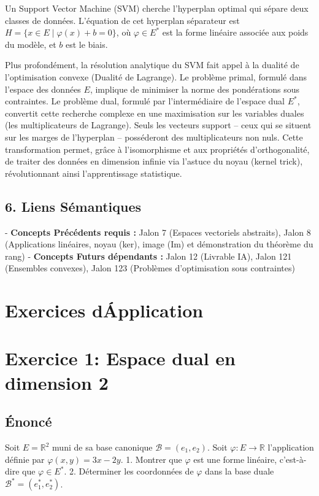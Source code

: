 \documentclass{report}
\begin{document}
Un Support Vector Machine (SVM) cherche l'hyperplan optimal qui sépare deux classes de données. L'équation de cet hyperplan séparateur est $H = \{ x \in E \mid \varphi(x) + b = 0 \}$, où $\varphi \in E^*$ est la forme linéaire associée aux poids du modèle, et $b$ est le biais.

Plus profondément, la résolution analytique du SVM fait appel à la dualité de l'optimisation convexe (Dualité de Lagrange). Le problème primal, formulé dans l'espace des données $E$, implique de minimiser la norme des pondérations sous contraintes. Le problème dual, formulé par l'intermédiaire de l'espace dual $E^*$, convertit cette recherche complexe en une maximisation sur les variables duales (les multiplicateurs de Lagrange). Seuls les vecteurs support – ceux qui se situent sur les marges de l'hyperplan – posséderont des multiplicateurs non nuls. Cette transformation permet, grâce à l'isomorphisme et aux propriétés d'orthogonalité, de traiter des données en dimension infinie via l'astuce du noyau (kernel trick), révolutionnant ainsi l'apprentissage statistique.

\section*{6. Liens Sémantiques}

- \textbf{Concepts Précédents requis :} Jalon 7 (Espaces vectoriels abstraits), Jalon 8 (Applications linéaires, noyau (ker), image (Im) et démonstration du théorème du rang)
- \textbf{Concepts Futurs dépendants :} Jalon 12 (Livrable IA), Jalon 121 (Ensembles convexes), Jalon 123 (Problèmes d'optimisation sous contraintes)

\newpage
\chapter*{Exercices d\'Application}
\chapter*{Exercice 1: Espace dual en dimension 2}
\section*{Énoncé}
Soit $E = \mathbb{R}^2$ muni de sa base canonique $\mathcal{B} = (e_1, e_2)$. Soit $\varphi : E \to \mathbb{R}$ l'application définie par $\varphi(x, y) = 3x - 2y$.
1. Montrer que $\varphi$ est une forme linéaire, c'est-à-dire que $\varphi \in E^*$.
2. Déterminer les coordonnées de $\varphi$ dans la base duale $\mathcal{B}^* = (e_1^*, e_2^*)$.
\end{document}
